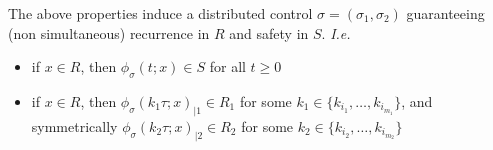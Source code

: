 \begin{corollary}
The above properties induce a distributed control $\sigma = (\sigma_1,\sigma_2)$ guaranteeing
(non simultaneous) recurrence in $R$ and safety in $S$. \textit{I.e.}
\begin{itemize}
 \item if $x \in R$, then $\phi_\sigma (t;x) \in S$ for all $t\geq 0$

 \item if $x \in R$, then $\phi_\sigma ( k_1\tau;x)_{|1} \in R_1$ for some
 $k_1 \in \{ k_{i_1},\dots, k_{i_{m_1}} \}$, and symmetrically
 $\phi_\sigma ( k_2\tau;x)_{|2} \in R_2$ for some
 $k_2 \in \{ k_{i_2},\dots, k_{i_{m_2}} \}$
\end{itemize}


%
%
\end{corollary}

